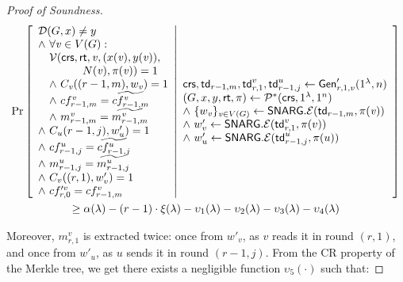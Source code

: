 \begin{proof}[Proof of Soundness]
\begin{gather*}
    \Pr \left[ \begin{array}{ll} 
    \mathcal{D}(G, x)\neq y  \\
    \wedge\ \forall \mathit{ v }\in V(G) : \\
    \quad \mathcal{V}(\mathsf{crs}, \mathsf{rt}, \mathit{ v }, (x(\mathit{ v }), y(\mathit{ v })),\\
    \qquad \qquad N(\mathit{ v }), \pi(\mathit{ v })) = 1 \\
    \quad \wedge ~C_{\mathit{ v }}((r-1, m), w_{\mathit{ v }}) = 1 \\
    \quad \wedge ~cf^{\mathit{ v }}_{r-1, m} = \widetilde{cf^{\mathit{ v }}_{r-1,m}} \\
    \quad \wedge ~m^{\mathit{ v }}_{r-1,m} = \widetilde{m^{\mathit{ v }}_{r-1,m}} \\
    \wedge ~C_{u}(r-1,j),w'_{u}) = 1 \\
    \wedge ~cf^u_{r-1,j} = \widetilde{cf^u_{r-1,j}} \\
    \wedge ~m^u_{r-1,j} = \widetilde{m^u_{r-1,j}} \\
    \wedge ~C_v((r,1),w'_v) = 1 \\
    \wedge ~cf'^v_{r,0} = cf^v_{r-1,m}
     \end{array} \middle\vert \begin{array}{ll} 
    \mathsf{crs}, \mathsf{td}_{r-1,m}, \mathsf{td}^v_{r,1}, \mathsf{td}^{u}_{r-1, j}\leftarrow \mathsf{Gen}'_{r,1,v}(1^\lambda, n) \\
    (G, x, y, \mathsf{rt}, \pi) \leftarrow \mathcal{P}^*(\mathsf{crs}, 1^\lambda, 1^n)\\
    \wedge ~\{w_{\mathit{ v }}\}_{\mathit{ v }\in V(G)}\leftarrow \mathsf{SNARG}.\mathcal{E}(\mathsf{td}_{r-1,m}, \pi(\mathit{ v })) \\
    \wedge ~w'_v\leftarrow \mathsf{SNARG}.\mathcal{E}(\mathsf{td}^v_{r,1}, \pi(v)) \\
    \wedge ~w'_{u}\leftarrow \mathsf{SNARG}.\mathcal{E}(\mathsf{td}^{u}_{r-1,j}, \pi(u))
     \end{array} \right]\\
    \geq \alpha(\lambda) - (r-1)\cdot\xi(\lambda) - \upsilon_1(\lambda) - \upsilon_2(\lambda) - \upsilon_3(\lambda) - \upsilon_4(\lambda)
\end{gather*}

Moreover, $m^v_{r,1}$ is extracted twice: once from $w'_v$, as $v$ reads it in round $(r,1)$, and once from $w'_{u}$, as $u$ sends it in round $(r-1,j)$. From the CR property of the Merkle tree, we get there exists a negligible function $\upsilon_5(\cdot)$ such that:



\end{proof}
